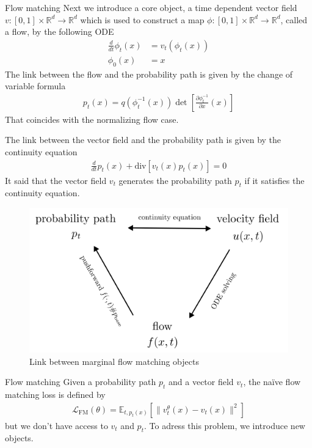 \documentclass{beamer}
\begin{document}
\begin{frame}{Flow matching}
    Next we introduce a core object, a time dependent vector field \(v:[0,1]\times\mathbb{R}^d\rightarrow \mathbb{R}^d\) which is used to construct a map \(\phi:[0,1]\times\mathbb{R}^d\rightarrow\mathbb{R}^d\), called a flow, by the following ODE
    \begin{align}
        \frac{d}{dt}\phi_t(x)&=v_t(\phi_t(x)) \\
        \phi_0(x)&=x \nonumber
    \end{align}
    The link between the flow and the probability path is given by the change of variable formula
    \begin{align}
        p_t(x)=q(\phi_t^{-1}(x))\det \left[\frac{\partial\phi_t^{-1}}{\partial x}(x)\right]
    \end{align}
    That coincides with the normalizing flow case.
\end{frame}

\begin{frame}
    The link between the vector field and the probability path is given by the continuity equation 
    \begin{align}
        \frac{d}{dt}p_t(x)+\text{div}\left[v_t(x)p_t(x)\right]=0
    \end{align}
    It said that the vector field \(v_t\) generates the probability path \(p_t\) if it satisfies the continuity equation.\\

    \begin{figure}[b]
        \centering
        \includegraphics[width=0.7\linewidth]{images/LinkBetweenObjects.png}
        \caption{Link between marginal flow matching objects}
        \label{fig:flow_matching}
    \end{figure}
\end{frame}

\begin{frame}{Flow matching}
    Given a probability path \(p_t\) and a vector field \(v_t\), the naïve flow matching loss is defined by
    \begin{align}
        \mathcal{L}_\text{FM}(\theta)=\mathbb{E}_{t,p_t(x)}\left[ \| v_t^\theta(x)-v_t(x)\|^2 \right]
    \end{align}
    but we don't have access to \(v_t\) and \(p_t\).
    \bigskip
    To adress this problem, we introduce new objects. 
\end{frame}
\end{document}

